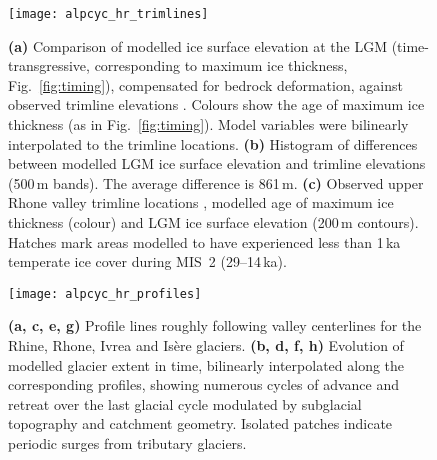 \documentclass[tc, manuscript]{copernicus}
\begin{document}
    \begin{figure}
      \centerline{\texttt{[image: alpcyc\_hr\_trimlines]}}
      \caption{%
        \textbf{(a)} Comparison of modelled ice surface elevation at the LGM
        (time-transgressive, corresponding to maximum ice thickness,
        Fig.~\ref{fig:timing}), compensated for bedrock deformation, against
        observed trimline elevations \citep[Table~1]{Kelly.etal.2004}. Colours
        show the age of maximum ice thickness (as in Fig.~\ref{fig:timing}).
        Model variables were bilinearly interpolated to the trimline locations.
        \textbf{(b)} Histogram of differences between modelled LGM ice surface
        elevation and trimline elevations (500\,m bands). The average
        difference is 861\,m.
        \textbf{(c)} Observed upper Rhone valley trimline locations
        \citep[Table~1]{Kelly.etal.2004}, modelled age of maximum ice thickness
        (colour) and LGM ice surface elevation (200\,m contours). Hatches
        mark areas modelled to have experienced less than 1\,ka temperate ice
        cover during MIS~2 (29--14\,ka).}
      \label{fig:trimlines}
    \end{figure}

    \begin{figure*}
      \centerline{\texttt{[image: alpcyc\_hr\_profiles]}}
      \caption{%
        \textbf{(a, c, e, g)} Profile lines roughly following valley
        centerlines for the Rhine, Rhone, Ivrea and Isère glaciers.
        \textbf{(b, d, f, h)} Evolution of modelled glacier extent in time,
        bilinearly interpolated along the corresponding profiles, showing
        numerous cycles of advance and retreat over the last glacial cycle
        modulated by subglacial topography and catchment geometry.
        Isolated patches indicate periodic surges from tributary glaciers.}
      \label{fig:profiles}
    \end{figure*}


\clearpage
\end{document}
